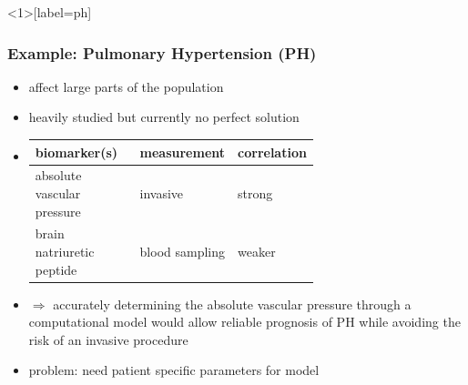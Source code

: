 \documentclass{beamer}
\begin{document}
\begin{frame}<1>[label=ph]
	\frametitle{Example: Pulmonary Hypertension (PH)}
	\begin{itemize}
		\item<1-> affect large parts of the population
		\item<2-> heavily studied but currently no perfect solution 
		\item<3-> \begin{tabularx}{\linewidth}{| >{\centering\arraybackslash}m{0.4\linewidth} | >{\centering\arraybackslash}m{0.25\linewidth} | >{\centering\arraybackslash}X |} 
				\hline
				biomarker(s) & measurement & correlation \\ 
				\hline
				\hline
				absolute vascular pressure & invasive & strong \\ 
				\hline
				brain natriuretic peptide & blood sampling & weaker \\ 
				\hline
			\end{tabularx}
		\item<4->
			$\Rightarrow$ accurately determining the absolute vascular pressure through a computational model would allow reliable prognosis of PH while avoiding the risk of an invasive procedure
		\item<5-> problem: need patient specific parameters for model
	\end{itemize}
\end{frame}

\end{document}
